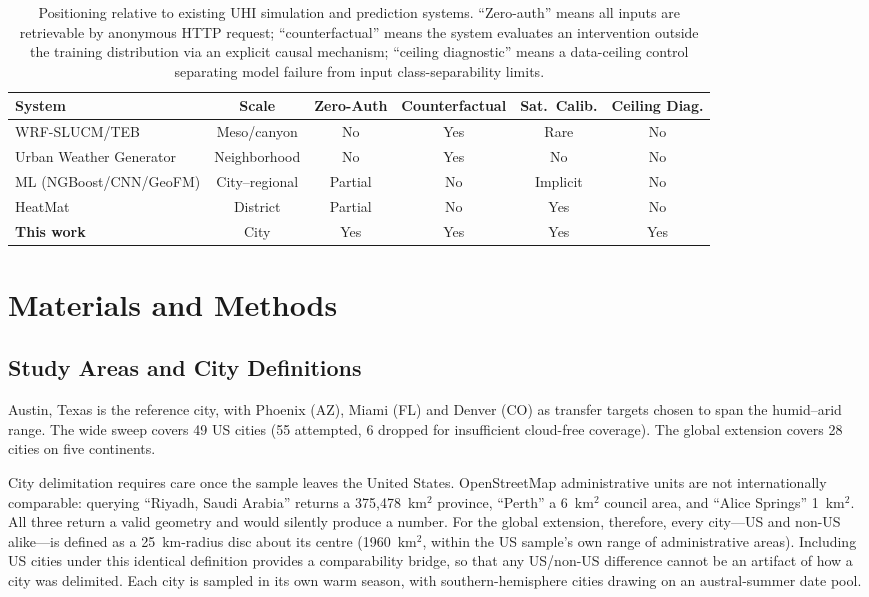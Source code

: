\documentclass[remotesensing,article,submit,oneauthor]{Definitions/mdpi}
\begin{document}
\begin{table}[H]
\caption{Positioning relative to existing UHI simulation and prediction
systems. ``Zero-auth'' means all inputs are retrievable by anonymous HTTP
request; ``counterfactual'' means the system evaluates an intervention
outside the training distribution via an explicit causal mechanism;
``ceiling diagnostic'' means a data-ceiling control separating model
failure from input class-separability limits.\label{tab:novelty}}
\begin{tabularx}{\textwidth}{lCCCCC}
\toprule
\textbf{System} & \textbf{Scale} & \textbf{Zero-Auth} &
\textbf{Counterfactual} & \textbf{Sat.\ Calib.} & \textbf{Ceiling Diag.} \\
\midrule
WRF-SLUCM/TEB \cite{kusaka2001simple,masson2000physically} & Meso/canyon & No & Yes & Rare & No \\
Urban Weather Generator \cite{bueno2013urban} & Neighborhood & No & Yes & No & No \\
ML (NGBoost/CNN/GeoFM) \cite{lyu2022integrated,hoang2025geospatial} & City--regional & Partial & No & Implicit & No \\
HeatMat \cite{heatmat2025} & District & Partial & No & Yes & No \\
\textbf{This work} & City & Yes & Yes & Yes & Yes \\
\bottomrule
\end{tabularx}
\end{table}

\section{Materials and Methods}

\subsection{Study Areas and City Definitions}

Austin, Texas is the reference city, with Phoenix (AZ), Miami (FL) and
Denver (CO) as transfer targets chosen to span the humid--arid range. The
wide sweep covers 49 US cities (55 attempted, 6 dropped for insufficient
cloud-free coverage). The global extension covers 28 cities on five
continents.

City delimitation requires care once the sample leaves the United States.
OpenStreetMap administrative units are not internationally comparable:
querying ``Riyadh, Saudi Arabia'' returns a 375,478~km$^2$ province,
``Perth'' a 6~km$^2$ council area, and ``Alice Springs'' 1~km$^2$. All
three return a valid geometry and would silently produce a number. For
the global extension, therefore, every city---US and non-US alike---is
defined as a 25~km-radius disc about its centre (1960~km$^2$, within the
US sample's own range of administrative areas). Including US cities under
this identical definition provides a comparability bridge, so that any
US/non-US difference cannot be an artifact of how a city was delimited.
Each city is sampled in its own warm season, with southern-hemisphere
cities drawing on an austral-summer date pool.
\end{document}
